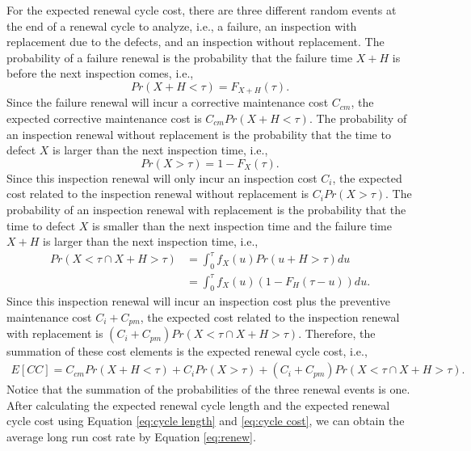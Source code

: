 \documentclass[10pt,a4paper]{article}
\theoremstyle{remark}
\begin{document}
For the expected renewal cycle cost, there are three different random events at the end of a renewal cycle to analyze, i.e., a failure, an inspection with replacement due to the defects, and an inspection without replacement. The probability of a failure renewal is the probability that the failure time $X+H$ is before the next inspection comes, i.e.,
\begin{equation*}
Pr(X+H<\tau)=F_{X+H}(\tau).
\end{equation*}
Since the failure renewal will incur a corrective maintenance cost $C_{cm}$, the expected corrective maintenance cost is $C_{cm}Pr(X+H<\tau)$. 
The probability of an inspection renewal without replacement is the probability that the time to defect $X$ is larger than the next inspection time, i.e.,
\begin{equation*}
Pr(X>\tau)=1-F_{X}(\tau).
\end{equation*}
Since this inspection renewal will only incur an inspection cost $C_{i}$, the expected cost related to the inspection renewal without replacement is $C_{i}Pr(X>\tau)$.
The probability of an inspection renewal with replacement is the probability that the time to defect $X$ is smaller than the next inspection time and the failure time $X+H$ is larger than the next inspection time, i.e.,
\begin{align*}
Pr(X<\tau \cap X+H>\tau) & = \int_{0}^{\tau} f_{X}(u) Pr(u+H>\tau)du \nonumber \\  
& = \int_{0}^{\tau} f_{X}(u) (1-F_{H}(\tau-u))du. \nonumber 
\end{align*}
Since this inspection renewal will incur an inspection cost plus the preventive maintenance cost $C_{i}+C_{pm}$, the expected cost related to the inspection renewal with replacement is $(C_{i}+C_{pm})Pr(X<\tau \cap X+H>\tau)$.
Therefore, the summation of these cost elements is the expected renewal cycle cost, i.e.,
\begin{align}\label{eq:cycle cost} 
E[CC]=C_{cm}Pr(X+H<\tau)+C_{i}Pr(X>\tau)+(C_{i}+C_{pm})Pr(X<\tau \cap X+H>\tau). 
\end{align} 
Notice that the summation of the probabilities of the three renewal events is one. After calculating the expected renewal cycle length and the expected renewal cycle cost using Equation \ref{eq:cycle length} and \ref{eq:cycle cost}, we can obtain the average long run cost rate by Equation \ref{eq:renew}. 
\end{document}
